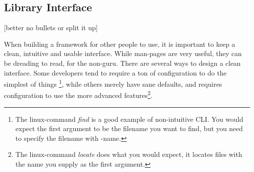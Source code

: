 \documentclass[a4paper]{article}
\begin{document}
\newpage
\subsection{Library Interface}
[better no bullets or split it up]

When building a framework for other people to use, it is important to keep a clean, intuitive and usable interface. While man-pages are very useful, they can be dreading to read, for the non-guru. There are several ways to design a clean interface. Some developers tend to require a ton of configuration to do the simplest of things \footnote{The linux-command \textit{find} is a good example of non-intuitive CLI. You would expect the first argument to be the filename you want to find, but you need to specify the filename with -name.}, while others merely have sane defaults, and requires configuration to use the more advanced features\footnote{The linux-command \textit{locate} does what you would expect, it locates files with the name you supply as the first argument.}.\\
\end{document}
